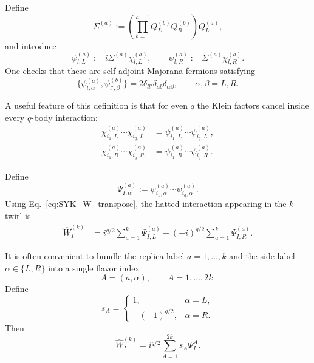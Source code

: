 \documentclass{article}
\theoremstyle{definition}
\begin{document}
Define
\begin{equation}
    \Sigma^{(a)}
    :=
    \left(
       \prod_{b=1}^{a-1}
       Q_L^{(b)}Q_R^{(b)}
    \right)
    Q_L^{(a)},
\end{equation}
and introduce
\begin{equation}
    \psi_{l,L}^{(a)}
    :=
    i\Sigma^{(a)}
    \chi_{l,L}^{(a)},
    \qquad
    \psi_{l,R}^{(a)}
    :=
    \Sigma^{(a)}
    \chi_{l,R}^{(a)}.
    \label{eq:SYK_psi_def}
\end{equation}
One checks that these are self-adjoint Majorana fermions satisfying
\begin{equation}
    \{
       \psi_{l,\alpha}^{(a)},
       \psi_{l',\beta}^{(b)}
    \}
    =
    2\delta_{ll'}\delta_{ab}\delta_{\alpha\beta},
    \qquad
    \alpha,\beta=L,R.
    \label{eq:majorana_CAR}
\end{equation}

A useful feature of this definition is that for even $q$ the Klein
factors cancel inside every $q$-body interaction:
\begin{align}
    \chi_{i_1,L}^{(a)}
    \cdots
    \chi_{i_q,L}^{(a)}
    &=
    \psi_{i_1,L}^{(a)}
    \cdots
    \psi_{i_q,L}^{(a)},
    \nonumber\\
    \chi_{i_1,R}^{(a)}
    \cdots
    \chi_{i_q,R}^{(a)}
    &=
    \psi_{i_1,R}^{(a)}
    \cdots
    \psi_{i_q,R}^{(a)}.
    \label{eq:SYK_evenq_Klein}
\end{align}

Define
\begin{equation}
    \Psi_{I,\alpha}^{(a)}
    :=
    \psi_{i_1,\alpha}^{(a)}
    \cdots
    \psi_{i_q,\alpha}^{(a)}.
\end{equation}
Using Eq.~\eqref{eq:SYK_W_transpose}, the hatted interaction appearing
in the $k$-twirl is
\begin{align}
    \widehat W_I^{(k)}
    &=
    i^{q/2}
    \sum_{a=1}^k
    \Psi_{I,L}^{(a)}
    -
    (-i)^{q/2}
    \sum_{a=1}^k
    \Psi_{I,R}^{(a)}.
    \label{eq:VSYK}
\end{align}

It is often convenient to bundle the replica label
$a=1,\ldots,k$ and the side label $\alpha\in\{L,R\}$ into a single
flavor index
\begin{equation}
    A=(a,\alpha),
    \qquad
    A=1,\ldots,2k.
\end{equation}
Define
\begin{equation}
    s_A
    =
    \begin{cases}
       1, & \alpha=L,\\[1mm]
       -(-1)^{q/2}, & \alpha=R.
    \end{cases}
    \label{eq:SYK_sA}
\end{equation}
Then
\begin{equation}
    \widehat W_I^{(k)}
    =
    i^{q/2}
    \sum_{A=1}^{2k}
    s_A\Psi_I^A.
    \label{eq:SYK_hatW_flavor}
\end{equation}
\end{document}
